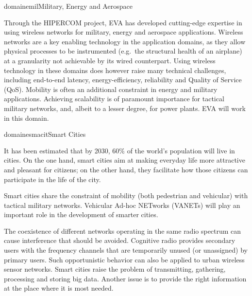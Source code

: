\documentclass{ra2016}
\begin{document}
\begin{module}{domaine}{mil}{Military, Energy and Aerospace}

Through the HIPERCOM project, EVA has developed cutting-edge expertise in using wireless networks for military, energy and aerospace applications. 
Wireless networks are a key enabling technology in the application domains, as they allow physical processes to be instrumented (e.g.~the structural health of an airplane) at a granularity not achievable by its wired counterpart.
Using wireless technology in these domains does however raise many technical challenges, including end-to-end latency, energy-efficiency, reliability and Quality of Service (QoS).
Mobility is often an additional constraint in energy and military applications.
Achieving scalability is of paramount importance for tactical military networks, and, albeit to a lesser degree, for power plants.
EVA will work in this domain.

\end{module}

\begin{module}{domaine}{smacit}{Smart Cities}

It has been estimated that by 2030, 60\% of the world's population will live in cities.
On the one hand, smart cities aim at making everyday life more attractive and pleasant for citizens; on the other hand, they facilitate how those citizens can participate in the life of the city.

Smart cities share the constraint of mobility (both pedestrian and vehicular) with tactical military networks.
Vehicular Ad-hoc NETworks (VANETs) will play an important role in the development of smarter cities.

The coexistence of different networks operating in the same radio spectrum can cause interference that should be avoided.
Cognitive radio provides secondary users with the frequency channels that are temporarily unused (or unassigned) by primary users.
Such opportunistic behavior can also be applied to urban wireless sensor networks.
Smart cities raise the problem of transmitting, gathering, processing and storing big data.
Another issue is to provide the right information at the place where it is most needed.

\end{module}
\end{document}
